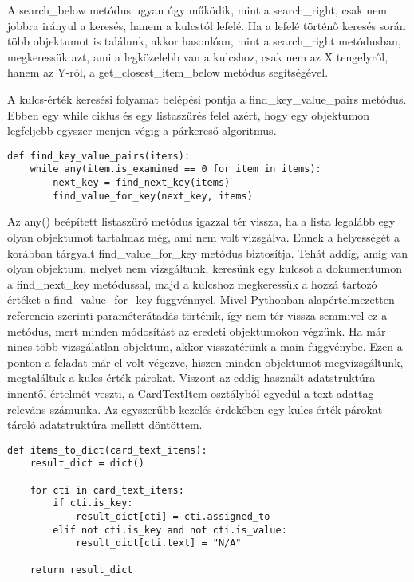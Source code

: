 \documentclass[12pt]{report}
\begin{document}
A search\_below metódus ugyan úgy működik, mint a search\_right, csak nem jobbra irányul a keresés, hanem a kulcstól lefelé. Ha a lefelé történő keresés során több objektumot is találunk, akkor hasonlóan, mint a search\_right metódusban, megkeressük azt, ami a legközelebb van a kulcshoz, csak nem az X tengelyről, hanem az Y-ról, a get\_closest\_item\_below metódus segítségével.

A kulcs-érték keresési folyamat belépési pontja a find\_key\_value\_pairs metódus. Ebben egy while ciklus és egy listaszűrés felel azért, hogy egy objektumon legfeljebb egyszer menjen végig a párkereső algoritmus.

\begin{verbatim}
def find_key_value_pairs(items):
    while any(item.is_examined == 0 for item in items):
        next_key = find_next_key(items)
        find_value_for_key(next_key, items)
\end{verbatim}

Az any() beépített listaszűrő metódus igazzal tér vissza, ha a lista legalább egy olyan objektumot tartalmaz még, ami nem volt vizsgálva. Ennek a helyességét a korábban tárgyalt find\_value\_for\_key metódus biztosítja. Tehát addíg, amíg van olyan objektum, melyet nem vizsgáltunk, keresünk egy kulcsot a dokumentumon a  find\_next\_key metódussal, majd a kulcshoz megkeressük a hozzá tartozó értéket a find\_value\_for\_key függvénnyel. Mivel Pythonban alapértelmezetten referencia szerinti paraméterátadás történik, így nem tér vissza semmivel ez a metódus, mert minden módosítást az eredeti objektumokon végzünk.
Ha már nincs több vizsgálatlan objektum, akkor visszatérünk a main függvénybe. Ezen a ponton a feladat már el volt végezve, hiszen minden objektumot megvizsgáltunk, megtaláltuk a kulcs-érték párokat. Viszont az eddig használt adatstruktúra innentől értelmét veszti, a CardTextItem osztályból egyedül a text adattag releváns számunka. Az egyszerűbb kezelés érdekében egy kulcs-érték párokat tároló adatstruktúra mellett döntöttem.

\newpage

\begin{verbatim}
def items_to_dict(card_text_items):
    result_dict = dict()

    for cti in card_text_items:
        if cti.is_key:
            result_dict[cti] = cti.assigned_to
        elif not cti.is_key and not cti.is_value:
            result_dict[cti.text] = "N/A"

    return result_dict
\end{verbatim}
\end{document}
